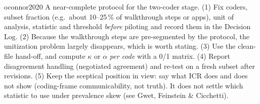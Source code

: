 \begin{papercard}{oconnor2020}
 A near-complete protocol for the two-coder stage. (1) Fix coders, subset fraction (e.g.\ about 10--25\,\% of walkthrough steps or apps), unit of analysis, statistic and threshold \emph{before} piloting and record them in the Decision Log. (2) Because the walkthrough steps are pre-segmented by the protocol, the unitization problem largely disappears, which is worth stating. (3) Use the clean-file hand-off, and compute $\kappa$ or $\alpha$ \emph{per code} with a 0/1 matrix. (4) Report disagreement handling (negotiated agreement) and re-test on a fresh subset after revisions. (5) Keep the sceptical position in view: say what ICR does and does not show (coding-frame communicability, not truth). It does not settle which statistic to use under prevalence skew (see Gwet, Feinstein \& Cicchetti).
\end{papercard}
